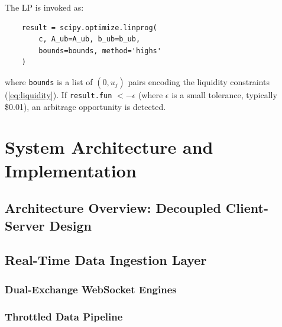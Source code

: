 \documentclass[openany]{book}
\numberwithin{figure}{chapter}
\numberwithin{equation}{chapter}
\begin{document}
The LP is invoked as:
\begin{verbatim}
    result = scipy.optimize.linprog(
        c, A_ub=A_ub, b_ub=b_ub,
        bounds=bounds, method='highs'
    )
\end{verbatim}
where \texttt{bounds} is a list of $(0, u_j)$ pairs encoding the liquidity constraints (\ref{eq:liquidity}). If \texttt{result.fun} $< -\epsilon$ (where $\epsilon$ is a small tolerance, typically \$0.01), an arbitrage opportunity is detected.

\chapter{System Architecture and Implementation}
%

\section{Architecture Overview: Decoupled Client-Server Design}

\section{Real-Time Data Ingestion Layer}

\subsection{Dual-Exchange WebSocket Engines}

\subsection{Throttled Data Pipeline}
\end{document}
